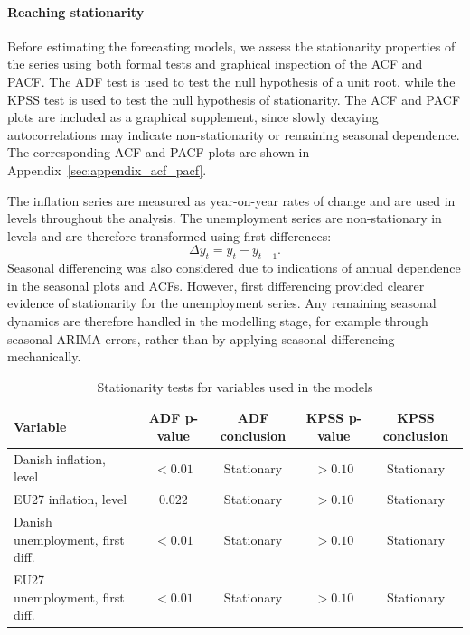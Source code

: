 \paragraph{Reaching stationarity} Before estimating the forecasting models, we assess the stationarity properties of the series using both formal tests and graphical inspection of the ACF and PACF. The ADF test is used to test the null hypothesis of a unit root, while the KPSS test is used to test the null hypothesis of stationarity. The ACF and PACF plots are included as a graphical supplement, since slowly decaying autocorrelations may indicate non-stationarity or remaining seasonal dependence. The corresponding ACF and PACF plots are shown in Appendix~\ref{sec:appendix_acf_pacf}.


The inflation series are measured as year-on-year rates of change and are used in levels throughout the analysis. The unemployment series are non-stationary in levels and are therefore transformed using first differences:
\[
\Delta y_t = y_t - y_{t-1}.
\]
Seasonal differencing was also considered due to indications of annual dependence in the seasonal plots and ACFs. However, first differencing provided clearer evidence of stationarity for the unemployment series. Any remaining seasonal dynamics are therefore handled in the modelling stage, for example through seasonal ARIMA errors, rather than by applying seasonal differencing mechanically.

\begin{table}[H]
\centering
\small{
\caption{Stationarity tests for variables used in the models}
\begin{tabular*}{\textwidth}{@{\extracolsep{\fill}}lcccc}
\hline \hline
\rule{0pt}{12pt}\textbf{Variable} & \textbf{ADF p-value} & \textbf{ADF conclusion} & \textbf{KPSS p-value} & \textbf{KPSS conclusion} \\ [3pt]
\hline
\rule{0pt}{12pt} Danish inflation, level          & $<0.01$ & Stationary & $>0.10$ & Stationary \\ [3pt]
\rule{0pt}{12pt}EU27 inflation, level            & $0.022$ & Stationary & $>0.10$ & Stationary \\ [3pt]
\rule{0pt}{12pt}Danish unemployment, first diff. & $<0.01$ & Stationary & $>0.10$ & Stationary \\ [3pt]
\rule{0pt}{12pt}EU27 unemployment, first diff.   & $<0.01$ & Stationary & $>0.10$ & Stationary \\ [3pt]
\hline \hline
\end{tabular*}}
\label{tab:stationarity_tests}
\end{table}

